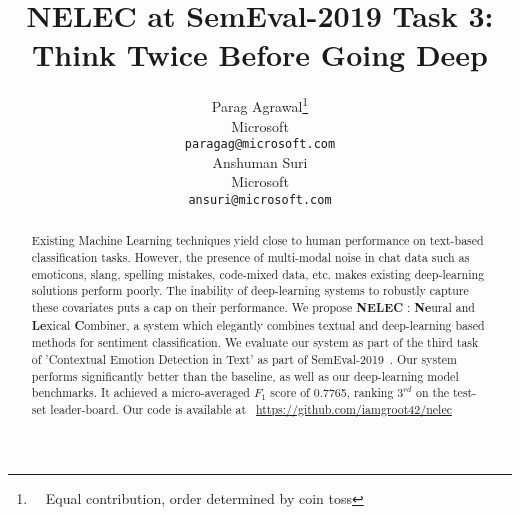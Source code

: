 \documentclass[11pt,a4paper]{article}
\title{NELEC at SemEval-2019 Task 3: Think Twice Before Going Deep}
\author{Parag Agrawal\thanks{\ \ Equal contribution, order determined by coin toss} \\
  Microsoft \\
  {\tt paragag@microsoft.com} \\\And
  Anshuman Suri\footnotemark[1]  \\
  Microsoft \\
  {\tt ansuri@microsoft.com} \\}
\date{}
\begin{document}
\maketitle
\begin{abstract}
  Existing Machine Learning techniques yield close to human performance on text-based classification tasks. However, the presence of multi-modal noise in chat data such as emoticons, slang, spelling mistakes, code-mixed data, etc. makes existing deep-learning solutions perform poorly. The inability of deep-learning systems to robustly capture these covariates puts a cap on their performance. We propose \textbf{NELEC} : \textbf{Ne}ural and \textbf{Le}xical \textbf{C}ombiner, a system which elegantly combines textual and deep-learning based methods for sentiment classification. We evaluate our system as part of the third task of 'Contextual Emotion Detection in Text' as part of SemEval-2019~\cite{SemEval2019Task3}. Our system performs significantly better than the baseline, as well as our deep-learning model benchmarks. It achieved a micro-averaged $F_{1}$ score of 0.7765, ranking $3^{rd}$ on the test-set leader-board. Our code is available at ~\url{https://github.com/iamgroot42/nelec}
\end{abstract}
\end{document}
